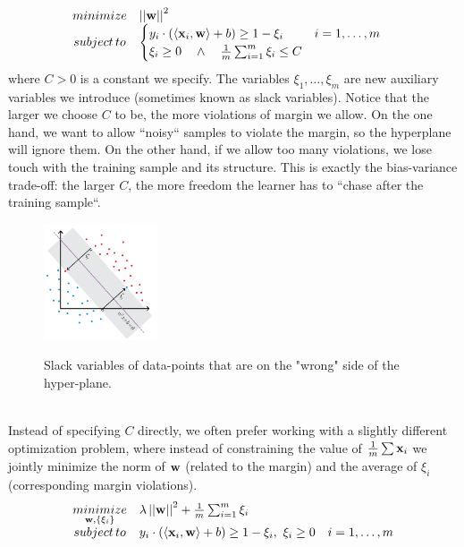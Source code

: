 \begin{equation}
	\begin{array}{clc}
		minimize & \left|\left| \mathbf{w}\right|\right|^2 & \\
		subject \, to & \begin{cases}
			y_i \cdot \left( \left\langle \mathbf{x}_i,\mathbf{w}\right\rangle+b \right) \geq 1-\xi_i & i=1,\ldots,m\\
			\xi_i \geq 0\quad \land\quad \frac{1}{m}\sum_{i=1}^m \xi_i \leq C & \\
		\end{cases}
	\end{array}
	\label{eqn:sofv_svm_opt}
\end{equation}
where $C>0$ is a constant we specify. The variables $\xi_1,\ldots,\xi_m$ are new auxiliary variables we introduce (sometimes known as slack variables). Notice that the larger we choose $C$ to be, the more violations of margin we allow. On the one hand, we want to allow ``noisy`` samples to violate the margin, so the hyperplane will ignore them. On the other hand, if we allow too many violations, we lose touch with the training sample and its structure. This is exactly the bias-variance trade-off: the larger $C$, the more freedom the learner has to ``chase after the training sample``.

\begin{figure}[H]
	\centering
	\includegraphics[width=0.3\textwidth]{chapters/classification/figures/3_6.png}
	\label{fig:soft_svm}
	\caption{Slack variables of data-points that are on the "wrong" side of the hyper-plane.}
\end{figure}
~\\
Instead of specifying $C$ directly, we often prefer working with a slightly different optimization problem, where instead of constraining the value of $\frac{1}{m}\sum\mathbf{x}_i$ we jointly minimize the norm of $\mathbf{w}$ (related to the margin) and the average of $\xi_i$ (corresponding margin violations).
\begin{equation}
	\begin{array}{cll}
		\underset{\mathbf{w},\left\{\xi_i\right\}}{minimize} & \lambda\left|\left| \mathbf{w}\right|\right|^2 + \frac{1}{m}\sum_{i=1}^m \xi_i& \\
		subject \, to & y_i \cdot \left( \left\langle \mathbf{x}_i,\mathbf{w}\right\rangle+b \right) \geq 1-\xi_i,\,\, \xi_i \geq0 & i=1,\ldots,m\\
	\end{array}
	\label{eqn:sofv_svm_opt}
\end{equation}

